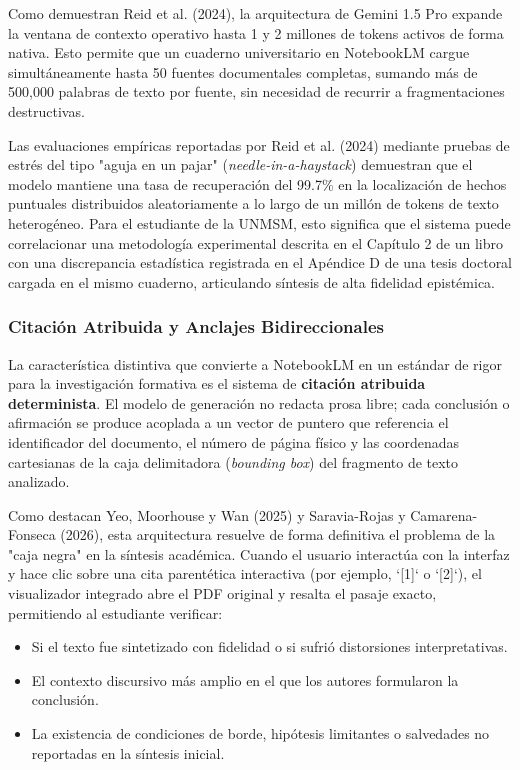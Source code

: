 Como demuestran Reid et al. (2024), la arquitectura de Gemini 1.5 Pro expande la ventana de contexto operativo hasta 1 y 2 millones de tokens activos de forma nativa. Esto permite que un cuaderno universitario en NotebookLM cargue simultáneamente hasta 50 fuentes documentales completas, sumando más de 500,000 palabras de texto por fuente, sin necesidad de recurrir a fragmentaciones destructivas.

Las evaluaciones empíricas reportadas por Reid et al. (2024) mediante pruebas de estrés del tipo "aguja en un pajar" (\textit{needle-in-a-haystack}) demuestran que el modelo mantiene una tasa de recuperación del 99.7\% en la localización de hechos puntuales distribuidos aleatoriamente a lo largo de un millón de tokens de texto heterogéneo. Para el estudiante de la UNMSM, esto significa que el sistema puede correlacionar una metodología experimental descrita en el Capítulo 2 de un libro con una discrepancia estadística registrada en el Apéndice D de una tesis doctoral cargada en el mismo cuaderno, articulando síntesis de alta fidelidad epistémica.

\subsubsection{Citación Atribuida y Anclajes Bidireccionales}

La característica distintiva que convierte a NotebookLM en un estándar de rigor para la investigación formativa es el sistema de \textbf{citación atribuida determinista}. El modelo de generación no redacta prosa libre; cada conclusión o afirmación se produce acoplada a un vector de puntero que referencia el identificador del documento, el número de página físico y las coordenadas cartesianas de la caja delimitadora (\textit{bounding box}) del fragmento de texto analizado.

Como destacan Yeo, Moorhouse y Wan (2025) y Saravia-Rojas y Camarena-Fonseca (2026), esta arquitectura resuelve de forma definitiva el problema de la "caja negra" en la síntesis académica. Cuando el usuario interactúa con la interfaz y hace clic sobre una cita parentética interactiva (por ejemplo, `[1]` o `[2]`), el visualizador integrado abre el PDF original y resalta el pasaje exacto, permitiendo al estudiante verificar:

\begin{itemize}
    \item Si el texto fue sintetizado con fidelidad o si sufrió distorsiones interpretativas.
    \item El contexto discursivo más amplio en el que los autores formularon la conclusión.
    \item La existencia de condiciones de borde, hipótesis limitantes o salvedades no reportadas en la síntesis inicial.
\end{itemize}

